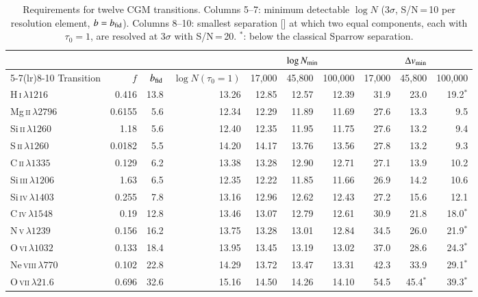 \begin{table}[t]
\centering\small
\caption{Requirements for twelve CGM transitions. Columns 5--7: minimum detectable $\log N$ (3$\sigma$, S/N\,=\,10 per resolution element, $b=b_{\rm fid}$). Columns 8--10: smallest separation [\kms] at which two equal components, each with $\tau_0=1$, are resolved at 3$\sigma$ with S/N\,=\,20. $^\ast$: below the classical Sparrow separation.}
\label{tab:ions}
\begin{tabular}{lrrrrrrrrr}
\toprule
 & & & & \multicolumn{3}{c}{$\log N_{\rm min}$} & \multicolumn{3}{c}{$\Delta v_{\rm min}$}\\
\cmidrule(lr){5-7}\cmidrule(lr){8-10}
Transition & $f$ & $b_{\rm fid}$ & $\log N(\tau_0{=}1)$ & 17{,}000 & 45{,}800 & 100{,}000 & 17{,}000 & 45{,}800 & 100{,}000\\
\midrule
H\,\textsc{i}\,$\lambda1216$ & 0.416 & 13.8 & 13.26 & 12.85 & 12.57 & 12.39 & 31.9 & 23.0 & 19.2$^\ast$ \\
Mg\,\textsc{ii}\,$\lambda2796$ & 0.6155 & 5.6 & 12.34 & 12.29 & 11.89 & 11.69 & 27.6 & 13.3 & 9.5 \\
Si\,\textsc{ii}\,$\lambda1260$ & 1.18 & 5.6 & 12.40 & 12.35 & 11.95 & 11.75 & 27.6 & 13.2 & 9.4 \\
S\,\textsc{ii}\,$\lambda1260$ & 0.0182 & 5.5 & 14.20 & 14.17 & 13.76 & 13.56 & 27.8 & 13.2 & 9.3 \\
C\,\textsc{ii}\,$\lambda1335$ & 0.129 & 6.2 & 13.38 & 13.28 & 12.90 & 12.71 & 27.1 & 13.9 & 10.2 \\
Si\,\textsc{iii}\,$\lambda1206$ & 1.63 & 6.5 & 12.35 & 12.22 & 11.85 & 11.66 & 26.9 & 14.2 & 10.6 \\
Si\,\textsc{iv}\,$\lambda1403$ & 0.255 & 7.8 & 13.16 & 12.96 & 12.62 & 12.43 & 27.2 & 15.6 & 12.1 \\
C\,\textsc{iv}\,$\lambda1548$ & 0.19 & 12.8 & 13.46 & 13.07 & 12.79 & 12.61 & 30.9 & 21.8 & 18.0$^\ast$ \\
N\,\textsc{v}\,$\lambda1239$ & 0.156 & 16.2 & 13.75 & 13.28 & 13.01 & 12.84 & 34.5 & 26.0 & 21.9$^\ast$ \\
O\,\textsc{vi}\,$\lambda1032$ & 0.133 & 18.4 & 13.95 & 13.45 & 13.19 & 13.02 & 37.0 & 28.6 & 24.3$^\ast$ \\
Ne\,\textsc{viii}\,$\lambda770$ & 0.102 & 22.8 & 14.29 & 13.72 & 13.47 & 13.31 & 42.3 & 33.9 & 29.1$^\ast$ \\
O\,\textsc{vii}\,$\lambda21.6$ & 0.696 & 32.6 & 15.16 & 14.50 & 14.26 & 14.10 & 54.5 & 45.4$^\ast$ & 39.3$^\ast$ \\
\bottomrule
\end{tabular}
\end{table}
